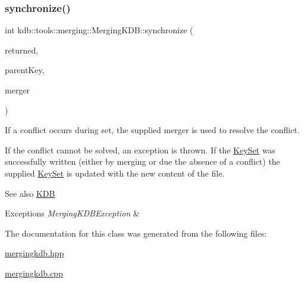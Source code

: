 \subsubsection{\texorpdfstring{synchronize()}{synchronize()}\hspace{0.1cm}{\footnotesize\ttfamily [2/2]}}
{\footnotesize\ttfamily int kdb\+::tools\+::merging\+::\+Merging\+K\+D\+B\+::synchronize (\begin{DoxyParamCaption}\item[{\mbox{\hyperlink{classkdb_1_1KeySet}{Key\+Set}} \&}]{returned,  }\item[{\mbox{\hyperlink{classkdb_1_1Key}{Key}} \&}]{parent\+Key,  }\item[{Three\+Way\+Merge \&}]{merger }\end{DoxyParamCaption})\hspace{0.3cm}{\ttfamily [virtual]}}



If a conflict occurs during set, the supplied merger is used to resolve the conflict. 

If the conflict cannot be solved, an exception is thrown. If the \mbox{\hyperlink{classkdb_1_1KeySet}{Key\+Set}} was successfully written (either by merging or due the absence of a conflict) the supplied \mbox{\hyperlink{classkdb_1_1KeySet}{Key\+Set}} is updated with the new content of the file.

\begin{DoxySeeAlso}{See also}
\mbox{\hyperlink{classkdb_1_1KDB}{K\+DB}} 
\end{DoxySeeAlso}

\begin{DoxyExceptions}{Exceptions}
{\em Merging\+K\+D\+B\+Exception} & \\
\hline
\end{DoxyExceptions}


The documentation for this class was generated from the following files\+:\begin{DoxyCompactItemize}
\item 
\mbox{\hyperlink{mergingkdb_8hpp}{mergingkdb.\+hpp}}\item 
\mbox{\hyperlink{mergingkdb_8cpp}{mergingkdb.\+cpp}}\end{DoxyCompactItemize}
